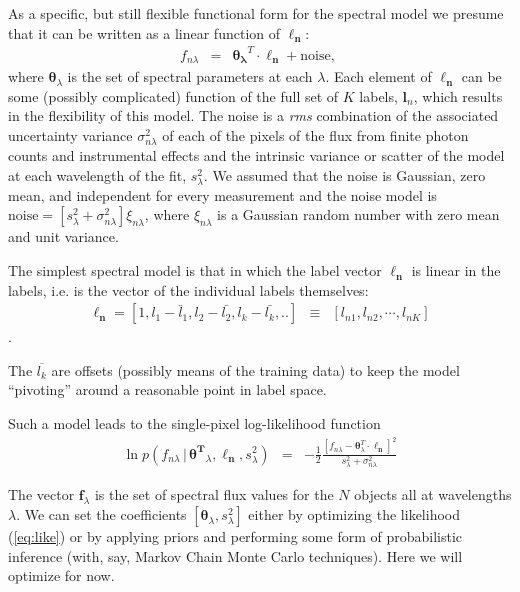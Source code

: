 \documentclass[12pt, preprint]{aastex}
\newcommand{\set}[1]{\bm{#1}}
\newcommand{\mean}[1]{\overline{#1}}
\newcommand{\given}{\,|\,}
\begin{document}
As a specific, but still flexible functional form for the spectral model we presume that it can be written as
a linear function of $\boldsymbol{\ell_n}$: 
\begin{eqnarray}
f_{n\lambda} &=&
\boldsymbol{\theta_\lambda}^T \cdot \boldsymbol{\ell_n} + \mbox{noise},
\
\label{eq:linearmodel}
\end{eqnarray}
where $\set{\theta}_\lambda$ is the set of spectral parameters at each $\lambda$.  Each element of $\boldsymbol{\ell_n}$ can be some (possibly complicated) function of the full set of $K$ labels, $\set{l}_n$, which
results in the flexibility of this model. The noise is a \textit{rms} combination of the associated uncertainty variance
$\sigma_{n\lambda}^2$ of each of the pixels of the flux from finite photon counts and instrumental effects and the intrinsic variance or scatter of the model at each wavelength of the fit, $s_\lambda^2$. We assumed that the noise is Gaussian, zero mean, and independent for every measurement and the noise model is $\mbox{noise} = [s_\lambda^2+ \sigma_{n\lambda}^2]\xi_{n\lambda}$, where $\xi_{n\lambda}$ is a Gaussian random number with zero mean and unit
variance.

The simplest spectral model is that in which the label vector $\boldsymbol{\ell_n}$ is
linear in the labels, i.e. is the vector of the individual labels themselves:
\begin{eqnarray}
\set{\ell_n} =  [1, l_1 - \bar{l}_1, l_2 - \bar{l_2}, l_k - \bar{l_k}, .. ] &\equiv& [l_{n1}, l_{n2}, \cdots, l_{nK}]
\label{eq:linear}
\end{eqnarray}.

The $\mean{l_k}$ are offsets (possibly means of the training data) to keep the model ``pivoting'' around a reasonable point in label space.


Such a  model leads to the single-pixel log-likelihood function 
\begin{eqnarray}
\ln p(f_{n\lambda}\given\set{\theta^T}_\lambda, \boldsymbol{\ell_n}, s_\lambda^2) &=&
 -\frac{1}{2}\frac{[f_{n\lambda} - \set{\theta}^T_\lambda \cdot \set{\ell_n}]^2}{s_\lambda^2 + \sigma_{n\lambda}^2}
\label{eq:like}
\end{eqnarray}


The vector $\set{f}_\lambda$ is the set of spectral flux values for
the $N$ objects all at wavelengths $\lambda$.
We can set the coefficients $[\set{\theta}_\lambda,s_\lambda^2]$ either by
optimizing the likelihood (\ref{eq:like}) or by applying priors and
performing some form of probabilistic inference (with, say, Markov
Chain Monte Carlo techniques).
Here we will optimize for now.
\end{document}
